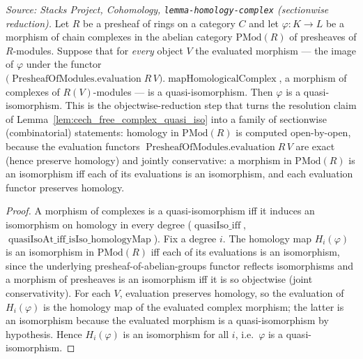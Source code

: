 \begin{lemma}
  \label{lem:quasiIso_of_evaluation}
  \textit{Source: Stacks Project, Cohomology, \texttt{lemma-homology-complex}
  (sectionwise reduction).}
  Let \(R\) be a presheaf of rings on a category \(C\) and let
  \(\varphi : K \to L\) be a morphism of chain complexes in the abelian category
  \(\mathrm{PMod}(R)\) of presheaves of \(R\)-modules. Suppose that for \emph{every}
  object \(V\) the evaluated morphism — the image of \(\varphi\) under the functor
  \(\bigl(\operatorname{PresheafOfModules.evaluation} R\, V\bigr).
  \operatorname{mapHomologicalComplex}\), a morphism of complexes of
  \(R(V)\)-modules — is a quasi-isomorphism. Then \(\varphi\) is a
  quasi-isomorphism. This is the objectwise-reduction step that turns the
  resolution claim of Lemma~\ref{lem:cech_free_complex_quasi_iso} into a family of
  sectionwise (combinatorial) statements: homology in \(\mathrm{PMod}(R)\) is
  computed open-by-open, because the evaluation functors
  \(\operatorname{PresheafOfModules.evaluation} R\, V\) are exact (hence preserve
  homology) and jointly conservative: a morphism in \(\mathrm{PMod}(R)\) is an isomorphism
  iff each of its evaluations is an isomorphism, and each evaluation functor preserves
  homology.
\end{lemma}

\begin{proof}
  A morphism of complexes is a quasi-isomorphism iff it induces an isomorphism on
  homology in every degree (\(\operatorname{quasiIso\_iff}\),
  \(\operatorname{quasiIsoAt\_iff\_isIso\_homologyMap}\)). Fix a degree \(i\). The
  homology map \(H_i(\varphi)\) is an isomorphism in \(\mathrm{PMod}(R)\) iff each of
  its evaluations is an isomorphism, since the underlying
  presheaf-of-abelian-groups functor reflects isomorphisms and a morphism of
  presheaves is an isomorphism iff it is so objectwise (joint conservativity). For
  each \(V\), evaluation preserves homology, so the evaluation of \(H_i(\varphi)\)
  is the homology map of the evaluated complex morphism; the latter is an
  isomorphism because the evaluated morphism is a quasi-isomorphism by hypothesis.
  Hence \(H_i(\varphi)\) is an isomorphism for all \(i\), i.e.\ \(\varphi\) is a
  quasi-isomorphism.
\end{proof}

